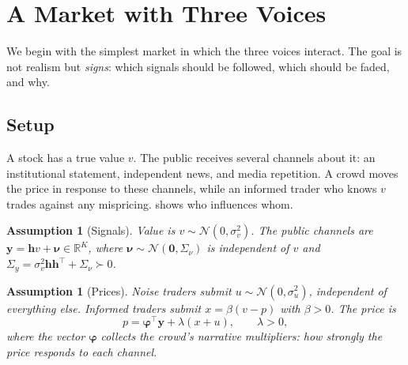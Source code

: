 \documentclass[11pt,a4paper]{article}
\theoremstyle{sci}
\theoremstyle{scidef}
\newtheorem{assumption}[theorem]{Assumption}
\newcommand{\R}{\mathbb{R}}
\newcommand{\N}{\mathcal{N}}
\newcommand{\y}{\bm{y}}
\newcommand{\h}{\bm{h}}
\newcommand{\bphi}{\bm{\varphi}}
\begin{document}
\section{A Market with Three Voices}\label{sec:model}

We begin with the simplest market in which the three voices interact. The goal is not realism but \emph{signs}: which signals should be followed, which should be faded, and why.

\subsection{Setup}

A stock has a true value $v$. The public receives several channels about it: an institutional statement, independent news, and media repetition. A crowd moves the price in response to these channels, while an informed trader who knows $v$ trades against any mispricing.  shows who influences whom.

\begin{assumption}[Signals]\label{ass:signals}
Value is $v\sim\N(0,\sigma_v^2)$. The public channels are $\y=\h v+\bm\nu\in\R^K$, where $\bm\nu\sim\N(\bm0,\Sigma_\nu)$ is independent of $v$ and $\Sigma_y=\sigma_v^2\h\h^\top+\Sigma_\nu\succ0$.
\end{assumption}

\begin{assumption}[Prices]\label{ass:price}
Noise traders submit $u\sim\N(0,\sigma_u^2)$, independent of everything else. Informed traders submit $x=\beta(v-p)$ with $\beta>0$. The price is
\[
  p=\bphi^\top\y+\lambda(x+u),\qquad \lambda>0,
\]
where the vector $\bphi$ collects the crowd's \emph{narrative multipliers}: how strongly the price responds to each channel.
\end{assumption}
\end{document}
